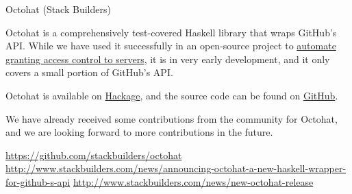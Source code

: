 \documentclass[DIV16,twocolumn,10pt]{scrreprt}
\begin{document}
\begin{hcarentry}{Octohat (Stack Builders)}
\makeheader

Octohat is a comprehensively test-covered Haskell library that wraps
GitHub's API. While we have used it successfully in an open-source
project to
\href{https://hackage.haskell.org/package/openssh-github-keys}{automate
  granting access control to servers}, it is in very early
development, and it only covers a small portion of GitHub's API.

Octohat is available on
\href{http://http://hackage.haskell.org/package/octohat}{Hackage}, and
the source code can be found on
\href{https://github.com/stackbuilders/octohat}{GitHub}.

We have already received some contributions from the community for
Octohat, and we are looking forward to more contributions in the
future.

\FurtherReading
\url{https://github.com/stackbuilders/octohat} \url{http://www.stackbuilders.com/news/announcing-octohat-a-new-haskell-wrapper-for-github-s-api} \url{http://www.stackbuilders.com/news/new-octohat-release}
\end{hcarentry}
\end{document}
